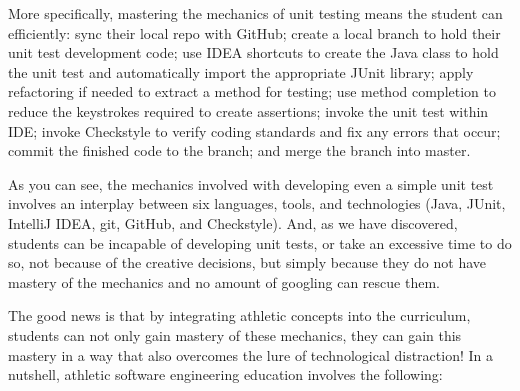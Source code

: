 More specifically, mastering the mechanics of unit testing means the student can efficiently: sync their local repo with GitHub; create a local branch to hold their unit test development code; use IDEA shortcuts to create the Java class to hold the unit test and automatically import the appropriate JUnit library; apply refactoring if needed to extract a method for testing; use method completion to reduce the keystrokes required to create assertions; invoke the unit test within IDE; invoke Checkstyle to verify coding standards and fix any errors that occur; commit the finished code to the branch; and merge the branch into master. 

As you can see, the mechanics involved with developing even a simple unit test involves an interplay between six languages, tools, and technologies (Java, JUnit, IntelliJ IDEA, git, GitHub, and Checkstyle). And, as we have discovered, students can be incapable of developing unit tests, or take an excessive time to do so, not because of the creative decisions, but simply because they do not have mastery of the mechanics and no amount of googling can rescue them.

The good news is that by integrating athletic concepts into the curriculum, students can not only gain mastery of these mechanics, they can gain this mastery in a way that also overcomes the lure of technological distraction!  In a nutshell, athletic software engineering education involves the following:

